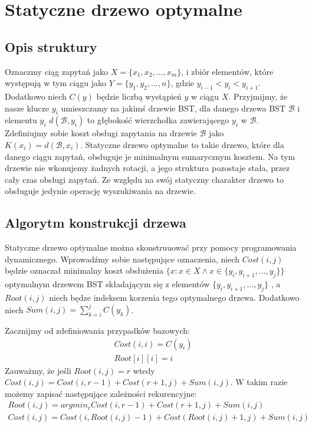 \documentclass[declaration,shortabstract]{iithesis}
\theoremstyle{thm}
\theoremstyle{remark}
\theoremstyle{plain}
\theoremstyle{plain}
\theoremstyle{plain}
\begin{document}
\chapter{Statyczne drzewo optymalne}

\section{Opis struktury}

Oznaczmy ciąg zapytań jako \( X = \{x_1, x_2, ..., x_m\}\), i zbiór elementów, które występują w tym ciągu jako \( Y = \{y_1, y_2, ..., n\}\), gdzie \(y_{i-1} < y_i < y_{i+1}\). 
Dodatkowo niech \(C(y)\) będzie liczbą wystąpień \(y\) w ciągu \(X\). 
Przyjmijmy, że nasze klucze \(y_i\) umieszczamy na jakimś drzewie BST, dla danego drzewa BST \(\mathcal{B}\) i elementu \(y_i\) \( d(\mathcal{B}, y_i)\) to głębokość wierzchołka zawierającego \(y_i\) w \(\mathcal{B}\). 
Zdefiniujmy sobie koszt obsługi zapytania na drzewie \(\mathcal{B}\) jako \(K(x_i) = d(\mathcal{B}, x_i)\).
Statyczne drzewo optymalne to takie drzewo, które dla danego ciągu zapytań, obsługuje je minimalnym sumarycznym kosztem. 
Na tym drzewie nie wkonujemy żadnych rotacji, a jego struktura pozostaje stała, przez cały czas obsługi zapytań. 
Ze względu na swój statyczny charakter drzewo to obsługuje jedynie operację wyszukiwania na drzewie.

\section{Algorytm konstrukcji drzewa}

Statyczne drzewo optymalne można skonstruuować przy pomocy programowania dynamicznego. Wprowadźmy sobie następujące oznaczenia, niech \(Cost(i, j)\) będzie oznaczał minimalny koszt obsłużenia \(\{ x : x\in X \wedge x\in \{y_i, y_{i+1}, ..., y_{j}\}\}\) optymalnym drzewem BST składającym się z elementów \(\{y_i, y_{i+1}, ..., y_{j}\}\) , a \(Root(i, j)\) niech będze indeksem korzenia tego optymalnego drzewa. Dodatkowo niech \(Sum(i, j) = \sum_{k = i}^j C(y_k)\).

Zacznijmy od zdefiniowania przypadków bazowych: 
\begin{align*}
Cost(i, i) = C(y_i)\\
Root[i][i] = i
\end{align*}
Zauważmy, że jeśli \(Root(i, j) = r\) wtedy \(Cost(i, j) =  Cost(i, r-1) + Cost(r+1, j) + Sum(i, j)\). W takim razie możemy zapisać następujące zależności rekurencyjne:
\begin{align*}
Root(i, j) = argmin_r Cost(i, r-1) + Cost(r+1, j) + Sum(i, j)\\
Cost(i, j) =  Cost(i, Root(i, j)-1) + Cost(Root(i, j)+1, j) + Sum(i, j)\\
\end{align*}
\end{document}
